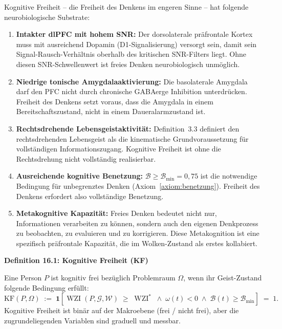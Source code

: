 ﻿\documentclass[12pt,a4paper]{report}
\theoremstyle{plain}
\theoremstyle{definition}
\theoremstyle{remark}
\DeclareMathOperator{\WZI}{WZI}
\begin{document}
	Kognitive Freiheit -- die Freiheit des Denkens im engeren Sinne --
	hat folgende neurobiologische Substrate:

	\begin{enumerate}[label=\textbf{(\arabic*)}, leftmargin=1.8cm]
		\item \textbf{Intakter dlPFC mit hohem SNR:}
		Der dorsolaterale präfrontale Kortex muss mit
		ausreichend Dopamin (D1-Signalisierung) versorgt sein,
		damit sein Signal-Rausch-Verhältnis oberhalb des kritischen
		SNR-Filters liegt. Ohne diesen SNR-Schwellenwert ist
		freies Denken neurobiologisch unmöglich.

		\item \textbf{Niedrige tonische Amygdalaaktivierung:}
		Die basolaterale Amygdala darf den PFC nicht durch chronische
		GABAerge Inhibition unterdrücken. Freiheit des Denkens
		setzt voraus, dass die Amygdala in einem Bereitschaftszustand,
		nicht in einem Daueralarmzustand ist.

		\item \textbf{Rechtsdrehende Lebensgeistaktivität:}
		Definition~3.3 definiert den rechtsdrehenden Lebensgeist
		als die kinematische Grundvoraussetzung für vollständigen
		Informationszugang. Kognitive Freiheit ist ohne die
		Rechtsdrehung nicht vollständig realisierbar.

		\item \textbf{Ausreichende kognitive Benetzung:}
		$\mathcal{B} \geq \mathcal{B}_{\min} = 0{,}75$ ist die
		notwendige Bedingung für unbegrenztes Denken
		(Axiom~\ref{axiom:benetzung}). Freiheit des Denkens
		erfordert also vollständige Benetzung.

		\item \textbf{Metakognitive Kapazität:}
		Freies Denken bedeutet nicht nur, Informationen verarbeiten
		zu können, sondern auch den eigenen Denkprozess zu beobachten,
		zu evaluieren und zu korrigieren. Diese Metakognition
		ist eine spezifisch präfrontale Kapazität, die im Wolken-Zustand
		als erstes kollabiert.
	\end{enumerate}

	
	\noindent\textbf{Definition 16.1: Kognitive Freiheit (KF)}

		Eine Person $P$ ist kognitiv frei bezüglich Problemraum $\Omega$,
		wenn ihr Geist-Zustand folgende Bedingung erfüllt:
		\[
		\mathrm{KF}(P, \Omega)
		\;:=\;
		\mathbf{1}\!\left[
		\WZI(P, \mathcal{G}, \mathcal{W}) \;\geq\; \WZI^*
		\;\wedge\;
		\omega(t) < 0
		\;\wedge\;
		\mathcal{B}(t) \geq \mathcal{B}_{\min}
		\right]
		\;=\; 1.
		\]
		Kognitive Freiheit ist binär auf der Makroebene
		(frei / nicht frei), aber die zugrundeliegenden Variablen
		sind graduell und messbar.
\end{document}
